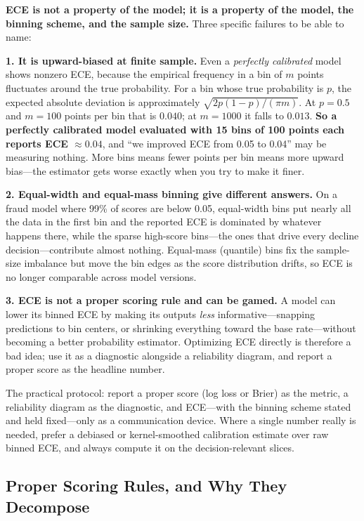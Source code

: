 \begin{warningbox}
\textbf{ECE is not a property of the model; it is a property of the model, the binning scheme, and the sample size.} Three specific failures to be able to name:

\textbf{1. It is upward-biased at finite sample.} Even a \textit{perfectly calibrated} model shows nonzero ECE, because the empirical frequency in a bin of $m$ points fluctuates around the true probability. For a bin whose true probability is $p$, the expected absolute deviation is approximately $\sqrt{2p(1-p)/(\pi m)}$. At $p = 0.5$ and $m = 100$ points per bin that is $0.040$; at $m = 1000$ it falls to $0.013$. \textbf{So a perfectly calibrated model evaluated with 15 bins of 100 points each reports ECE $\approx 0.04$}, and ``we improved ECE from 0.05 to 0.04'' may be measuring nothing. More bins means fewer points per bin means more upward bias---the estimator gets worse exactly when you try to make it finer.

\textbf{2. Equal-width and equal-mass binning give different answers.} On a fraud model where 99\% of scores are below 0.05, equal-width bins put nearly all the data in the first bin and the reported ECE is dominated by whatever happens there, while the sparse high-score bins---the ones that drive every decline decision---contribute almost nothing. Equal-mass (quantile) bins fix the sample-size imbalance but move the bin edges as the score distribution drifts, so ECE is no longer comparable across model versions.

\textbf{3. ECE is not a proper scoring rule and can be gamed.} A model can lower its binned ECE by making its outputs \textit{less} informative---snapping predictions to bin centers, or shrinking everything toward the base rate---without becoming a better probability estimator. Optimizing ECE directly is therefore a bad idea; use it as a diagnostic alongside a reliability diagram, and report a proper score as the headline number.
\end{warningbox}

The practical protocol: report a proper score (log loss or Brier) as the metric, a reliability diagram as the diagnostic, and ECE---with the binning scheme stated and held fixed---only as a communication device. Where a single number really is needed, prefer a debiased or kernel-smoothed calibration estimate over raw binned ECE, and always compute it on the decision-relevant slices.

\subsection{Proper Scoring Rules, and Why They Decompose}
\label{cml:sec:proper_scores}

